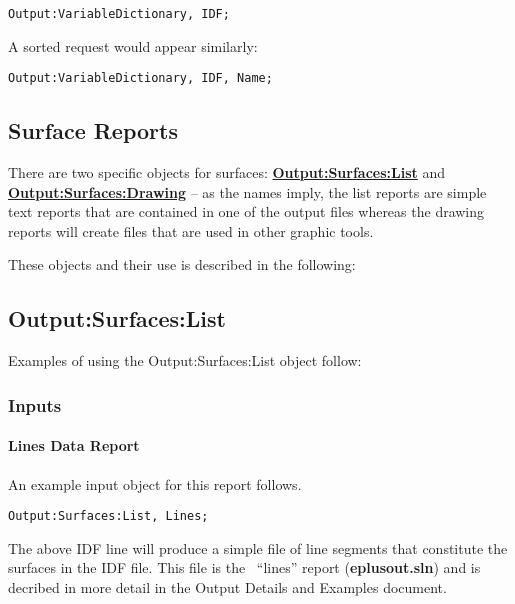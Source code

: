 \begin{lstlisting}
Output:VariableDictionary, IDF;
\end{lstlisting}

A sorted request would appear similarly:

\begin{lstlisting}
Output:VariableDictionary, IDF, Name;
\end{lstlisting}

\subsection{Surface Reports}\label{surface-reports}

There are two specific objects for surfaces: \textbf{\hyperref[outputsurfaceslist]{Output:Surfaces:List}} and \textbf{\hyperref[outputsurfacesdrawing]{Output:Surfaces:Drawing}} -- as the names imply, the list reports are simple text reports that are contained in one of the output files whereas the drawing reports will create files that are used in other graphic tools.

These objects and their use is described in the following:

\subsection{Output:Surfaces:List}\label{outputsurfaceslist}

Examples of using the Output:Surfaces:List object follow:

\subsubsection{Inputs}\label{inputs-040}

\paragraph{Lines Data Report}\label{lines-data-report}

An example input object for this report follows.

\begin{lstlisting}
Output:Surfaces:List, Lines;
\end{lstlisting}

The above IDF line will produce a simple file of line segments that constitute the surfaces in the IDF file. This file is the~ ``lines'' report (\textbf{eplusout.sln}) and is decribed in more detail in the Output Details and Examples document.


